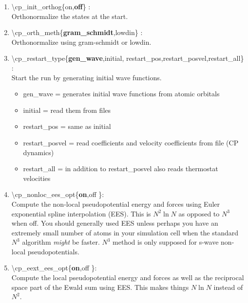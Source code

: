 \documentclass[12pt,titlepage]{article}
\begin{document}
\begin{enumerate}
 
 \vspace{0.15in} 
 \item  \textbackslash cp\_init\_orthog\{on,{\bf off}\} : \\
      Orthonormalize the states at the start.

 \vspace{0.15in} 
 \item  \textbackslash cp\_orth\_meth\{{\bf gram\_schmidt},lowdin\} : \\
      Orthonormalize using gram-schmidt or lowdin.

 \vspace{0.15in} 
 \item  \textbackslash cp\_restart\_type\{{\bf gen\_wave},initial,
                         restart\_pos,restart\_posvel,restart\_all\} : \\
      Start the run by generating initial wave functions.
      \begin{itemize}
\item      gen\_wave = generates initial wave functions from atomic orbitals
\item      initial = read them from files
\item       restart\_pos = same as initial  
\item       restart\_posvel = read coefficients and velocity coefficients from file (CP dynamics)
\item       restart\_all = in addition to restart\_posvel also reads thermostat velocities
      \end{itemize}

 \vspace{0.15in} 
 \item  \textbackslash cp\_nonloc\_ees\_opt\{{\bf on},off \}: \\     
 Compute the non-local pseudopotential energy and forces using Euler
 exponential spline interpolation (EES).  This is $N^2\ln N$ as opposed to $N^3$ when off.
 You should generally used EES unless perhaps you have an extremely small number of atoms
 in your simulation cell when the standard $N^3$ algorithm {\it might} be faster.  $N^3$ method is
 only supposed for s-wave non-local pseudopotentials.

 \vspace{0.15in} 
 \item  \textbackslash cp\_eext\_ees\_opt\{{\bf on},off \}: \\     
     Compute the local pseudopotential energy and forces as well as the 
     reciprocal space part of the Ewald sum using  EES.  This makes things $N\ln N$ instead of $N^2$.


\end{enumerate}
\end{document}
